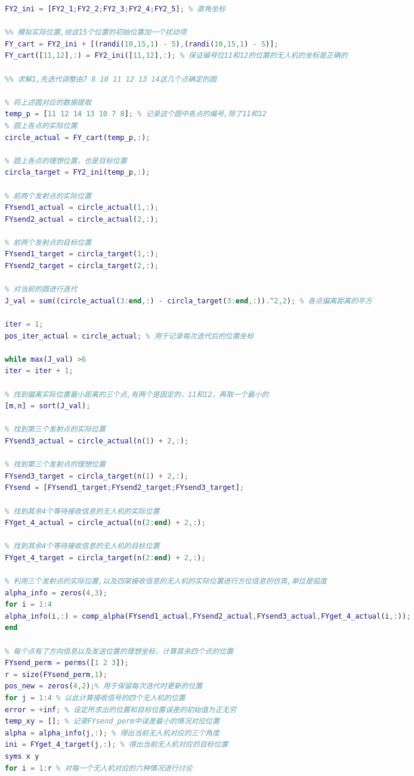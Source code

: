 \documentclass[12pt]{ctexart}
\begin{document}
\begin{spacing}{1.5}
\begin{lstlisting}[title="shumo\_B\_222.m",language=matlab]
FY2_ini = [FY2_1;FY2_2;FY2_3;FY2_4;FY2_5]; % 直角坐标

%% 模拟实际位置,给这15个位置的初始位置加一个扰动项
FY_cart = FY2_ini + [(randi(10,15,1) - 5),(randi(10,15,1) - 5)];
FY_cart([11,12],:) = FY2_ini([11,12],:); % 保证编号位11和12的位置的无人机的坐标是正确的

%% 求解1,先迭代调整由7 8 10 11 12 13 14这几个点确定的圆

% 将上述圆对应的数据提取 
temp_p = [11 12 14 13 10 7 8]; % 记录这个圆中各点的编号,除了11和12
% 圆上各点的实际位置
circle_actual = FY_cart(temp_p,:);

% 圆上各点的理想位置，也是目标位置
circla_target = FY2_ini(temp_p,:);

% 前两个发射点的实际位置
FYsend1_actual = circle_actual(1,:);
FYsend2_actual = circle_actual(2,:);

% 前两个发射点的目标位置
FYsend1_target = circla_target(1,:);
FYsend2_target = circla_target(2,:);

% 对当前的圆进行迭代
J_val = sum((circle_actual(3:end,:) - circla_target(3:end,:)).^2,2); % 各点偏离距离的平方

iter = 1;
pos_iter_actual = circle_actual; % 用于记录每次迭代后的位置坐标

while max(J_val) >6
iter = iter + 1;

% 找到偏离实际位置最小距离的三个点,有两个是固定的，11和12，再取一个最小的
[m,n] = sort(J_val);

% 找到第三个发射点的实际位置
FYsend3_actual = circle_actual(n(1) + 2,:);

% 找到第三个发射点的理想位置
FYsend3_target = circla_target(n(1) + 2,:);
FYsend = [FYsend1_target;FYsend2_target;FYsend3_target];

% 找到其余4个等待接收信息的无人机的实际位置
FYget_4_actual = circle_actual(n(2:end) + 2,:);

% 找到其余4个等待接收信息的无人机的目标位置
FYget_4_target = circla_target(n(2:end) + 2,:);

% 利用三个发射点的实际位置,以及四架接收信息的无人机的实际位置进行方位信息的仿真,单位是弧度
alpha_info = zeros(4,3);
for i = 1:4
alpha_info(i,:) = comp_alpha(FYsend1_actual,FYsend2_actual,FYsend3_actual,FYget_4_actual(i,:));
end

% 每个点有了方向信息以及发送位置的理想坐标，计算其余四个点的位置
FYsend_perm = perms([1 2 3]);
r = size(FYsend_perm,1);
pos_new = zeros(4,2);% 用于保留每次迭代时更新的位置
for j = 1:4 % 以此计算接收信号的四个无人机的位置
error = +inf; % 设定所求出的位置和目标位置误差的初始值为正无穷
temp_xy = []; % 记录FYsend_perm中误差最小的情况对应位置
alpha = alpha_info(j,:); % 得出当前无人机对应的三个角度
ini = FYget_4_target(j,:); % 得出当前无人机对应的目标位置
syms x y
for i = 1:r % 对每一个无人机对应的六种情况进行讨论


\end{lstlisting}
\end{spacing}
\end{document}
